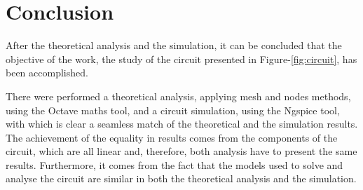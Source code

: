 \section{Conclusion}
\label{sec:conclusion}

After the theoretical analysis and the simulation, it can be concluded that the
objective of the work, the study of the circuit presented in Figure-\ref{fig:circuit},
has been accomplished. \par
There were performed a theoretical analysis, applying mesh and nodes methods,
using the Octave maths tool, and a circuit simulation, using the Ngspice tool, with which is clear a seamless match of the theoretical and the simulation results. The achievement of the equality in results comes from the components of the circuit, which are all linear and, therefore, both analysis have to present the same results. Furthermore, it comes from the fact that the models used to solve and analyse the circuit are similar in both the theoretical analysis and the simulation.
